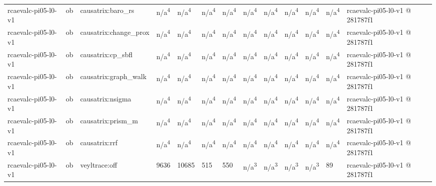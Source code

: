 \begin{table}[t]
\begin{tabular}{lllllllllllll}
rcaevalc-pi05-l0-v1 & ob & causatrix:baro\_rs & n/a\textsuperscript{4} & n/a\textsuperscript{4} & n/a\textsuperscript{4} & n/a\textsuperscript{4} & n/a\textsuperscript{4} & n/a\textsuperscript{4} & n/a\textsuperscript{4} & n/a\textsuperscript{4} & n/a\textsuperscript{4} & rcaevalc-pi05-l0-v1 @ 281787f1 \\
rcaevalc-pi05-l0-v1 & ob & causatrix:change\_prox & n/a\textsuperscript{4} & n/a\textsuperscript{4} & n/a\textsuperscript{4} & n/a\textsuperscript{4} & n/a\textsuperscript{4} & n/a\textsuperscript{4} & n/a\textsuperscript{4} & n/a\textsuperscript{4} & n/a\textsuperscript{4} & rcaevalc-pi05-l0-v1 @ 281787f1 \\
rcaevalc-pi05-l0-v1 & ob & causatrix:cp\_sbfl & n/a\textsuperscript{4} & n/a\textsuperscript{4} & n/a\textsuperscript{4} & n/a\textsuperscript{4} & n/a\textsuperscript{4} & n/a\textsuperscript{4} & n/a\textsuperscript{4} & n/a\textsuperscript{4} & n/a\textsuperscript{4} & rcaevalc-pi05-l0-v1 @ 281787f1 \\
rcaevalc-pi05-l0-v1 & ob & causatrix:graph\_walk & n/a\textsuperscript{4} & n/a\textsuperscript{4} & n/a\textsuperscript{4} & n/a\textsuperscript{4} & n/a\textsuperscript{4} & n/a\textsuperscript{4} & n/a\textsuperscript{4} & n/a\textsuperscript{4} & n/a\textsuperscript{4} & rcaevalc-pi05-l0-v1 @ 281787f1 \\
rcaevalc-pi05-l0-v1 & ob & causatrix:nsigma & n/a\textsuperscript{4} & n/a\textsuperscript{4} & n/a\textsuperscript{4} & n/a\textsuperscript{4} & n/a\textsuperscript{4} & n/a\textsuperscript{4} & n/a\textsuperscript{4} & n/a\textsuperscript{4} & n/a\textsuperscript{4} & rcaevalc-pi05-l0-v1 @ 281787f1 \\
rcaevalc-pi05-l0-v1 & ob & causatrix:prism\_m & n/a\textsuperscript{4} & n/a\textsuperscript{4} & n/a\textsuperscript{4} & n/a\textsuperscript{4} & n/a\textsuperscript{4} & n/a\textsuperscript{4} & n/a\textsuperscript{4} & n/a\textsuperscript{4} & n/a\textsuperscript{4} & rcaevalc-pi05-l0-v1 @ 281787f1 \\
rcaevalc-pi05-l0-v1 & ob & causatrix:rrf & n/a\textsuperscript{4} & n/a\textsuperscript{4} & n/a\textsuperscript{4} & n/a\textsuperscript{4} & n/a\textsuperscript{4} & n/a\textsuperscript{4} & n/a\textsuperscript{4} & n/a\textsuperscript{4} & n/a\textsuperscript{4} & rcaevalc-pi05-l0-v1 @ 281787f1 \\
rcaevalc-pi05-l0-v1 & ob & veyltrace:off & 9636 & 10685 & 515 & 550 & n/a\textsuperscript{3} & n/a\textsuperscript{3} & n/a\textsuperscript{3} & n/a\textsuperscript{3} & 89 & rcaevalc-pi05-l0-v1 @ 281787f1 \\

\end{tabular}
\end{table}
